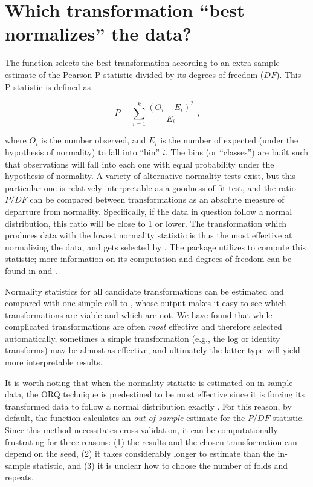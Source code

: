 \hypertarget{which-transformation-best-normalizes-the-data}{%
\section{Which transformation ``best normalizes'' the
data?}\label{which-transformation-best-normalizes-the-data}}

The  function selects the best transformation
according to an extra-sample estimate of the Pearson P statistic divided
by its degrees of freedom (\(DF\)). This P statistic is defined as

\[
P = \sum_{i=1}^{k} \frac{(O_i - E_i)^2}{E_i}\text{ ,}
\]

\noindent where \(O_i\) is the number observed, and \(E_i\) is the
number of expected (under the hypothesis of normality) to fall into
``bin'' \(i\). The bins (or ``classes'') are built such that
observations will fall into each one with equal probability under the
hypothesis of normality. A variety of alternative normality tests exist,
but this particular one is relatively interpretable as a goodness of fit
test, and the ratio \(P/DF\) can be compared between transformations as
an absolute measure of departure from normality. Specifically, if the
data in question follow a normal distribution, this ratio will be close
to 1 or lower. The transformation which produces data with the lowest
normality statistic is thus the most effective at normalizing the data,
and gets selected by . The 
package utilizes  \citep{nortest} to compute this
statistic; more information on its computation and degrees of freedom
can be found in \citet{d1986goodness} and \citet{thode2002testing}.

Normality statistics for all candidate transformations can be estimated
and compared with one simple call to , whose output
makes it easy to see which transformations are viable and which are not.
We have found that while complicated transformations are often
\emph{most} effective and therefore selected automatically, sometimes a
simple transformation (e.g., the log or identity transforms) may be
almost as effective, and ultimately the latter type will yield more
interpretable results.

It is worth noting that when the normality statistic is estimated on
in-sample data, the ORQ technique is predestined to be most effective
since it is forcing its transformed data to follow a normal distribution
exactly \citep{orq_paper}. For this reason, by default, the
 function calculates an \emph{out-of-sample}
estimate for the \(P/DF\) statistic. Since this method necessitates
cross-validation, it can be computationally frustrating for three
reasons: (1) the results and the chosen transformation can depend on the
seed, (2) it takes considerably longer to estimate than the in-sample
statistic, and (3) it is unclear how to choose the number of folds and
repeats.


